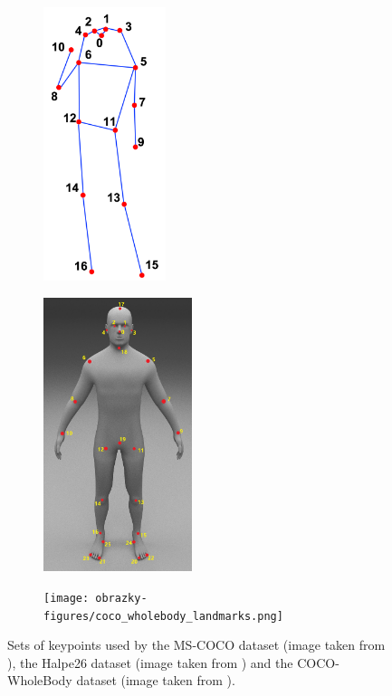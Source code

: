 \begin{figure}[htbp]
    \centering
    \begin{subfigure}[b]{0.2\textwidth}
        \centering

        \includegraphics[height=8cm]{obrazky-figures/coco_landmarks.png}
        \label{fig:image1}
    \end{subfigure}
    \hfill
    \begin{subfigure}[b]{0.25\textwidth}
        \centering

        \includegraphics[height=8cm]{obrazky-figures/halpe_landmarks.jpg}
        \label{fig:image2}
    \end{subfigure}
    \hfill
    \begin{subfigure}[b]{0.5\textwidth}
        \centering

        \texttt{[image: obrazky-figures/coco\_wholebody\_landmarks.png]}
        \label{fig:image3}
    \end{subfigure}

    \caption{Sets of keypoints used by the MS-COCO dataset (image taken from \cite{coco}), the Halpe26 dataset (image taken from \cite{halpe}) and the COCO-WholeBody dataset (image taken from \cite{halpe}).}
    \label{fig:subfigures}
\end{figure}



